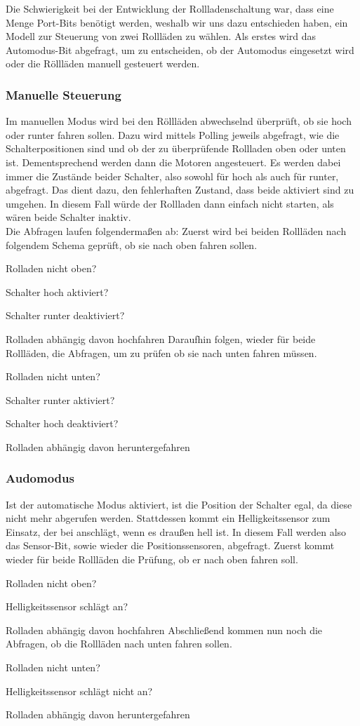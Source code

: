 Die Schwierigkeit bei der Entwicklung der Rollladenschaltung war, dass eine Menge Port-Bits benötigt werden, weshalb wir uns dazu entschieden haben, ein Modell zur Steuerung von zwei Rollläden zu wählen. Als erstes wird das Automodus-Bit abgefragt, um zu entscheiden, ob der Automodus eingesetzt wird oder die Röllläden manuell gesteuert werden.
\subsubsection{Manuelle Steuerung}
Im manuellen Modus wird bei den Röllläden abwechselnd überprüft, ob sie hoch oder runter fahren sollen. Dazu wird mittels Polling jeweils abgefragt, wie die Schalterpositionen sind und ob der zu überprüfende Rollladen oben oder unten ist. Dementsprechend werden dann die Motoren angesteuert. Es werden dabei immer die Zustände beider Schalter, also sowohl für hoch als auch für runter, abgefragt. Das dient dazu, den fehlerhaften Zustand, dass beide aktiviert sind zu umgehen. In diesem Fall würde der Rollladen dann einfach nicht starten, als wären beide Schalter inaktiv. \\
Die Abfragen laufen folgendermaßen ab:
Zuerst wird bei beiden Rollläden nach folgendem Schema geprüft, ob sie nach oben fahren sollen.
\item{Rolladen nicht oben?}
\item{Schalter hoch aktiviert?}
\item{Schalter runter deaktiviert?}
\item{Rolladen abhängig davon hochfahren}
Daraufhin folgen, wieder für beide Rollläden, die Abfragen, um zu prüfen ob sie nach unten fahren müssen.
\item{Rolladen nicht unten?}
\item{Schalter runter aktiviert?}
\item{Schalter hoch deaktiviert?}
\item{Rolladen abhängig davon heruntergefahren}

\subsubsection{Audomodus}
Ist der automatische Modus aktiviert, ist die Position der Schalter egal, da diese nicht mehr abgerufen werden. Stattdessen kommt ein Helligkeitssensor zum Einsatz, der bei anschlägt, wenn es draußen hell ist. In diesem Fall werden also das Sensor-Bit, sowie wieder die Positionssensoren, abgefragt.
Zuerst kommt wieder für beide Rollläden die Prüfung, ob er nach oben fahren soll.

\item{Rolladen nicht oben?}
\item{Helligkeitssensor schlägt an?}
\item{Rolladen abhängig davon hochfahren}
Abschließend kommen nun noch die Abfragen, ob die Rollläden nach  unten fahren sollen.
\item{Rolladen nicht unten?}
\item{Helligkeitssensor schlägt nicht an?}
\item{Rolladen abhängig davon heruntergefahren}
